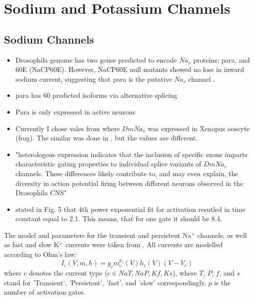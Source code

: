 \documentclass[../../workflow.tex]{subfiles}
\begin{document}
\section{Sodium and Potassium Channels}

\subsection{Sodium Channels}

\begin{itemize}
    \item Drosophila genome has two genes predicted to encode $Na_v$ proteins: para, and
    60E (NaCP60E). However, NaCP60E null mutants showed no loss in inward sodium current,
    suggesting that para is the putative $Na_v$ channel \parencite{ravenscroftDrosophilaVoltageGatedSodium2020}.
    \item para has 60 predicted isoforms via alternative splicing \parencite{ravenscroftDrosophilaVoltageGatedSodium2020}
    \item Para is only expressed in active neurons \parencite{ravenscroftDrosophilaVoltageGatedSodium2020}
    \item Currently I chose vales from \parencite{warmkeFunctionalExpressionDrosophila1997} where
    $DmNa_v$ was expressed in Xenopus ooscyte (frog). The similar was done in
    \parencite{linAlternativeSplicingVoltageGated2009}, but the values are different.
    \item "heterologous expression indicates that the inclusion of specific exons imparts
    characteristic gating properties to individual splice variants of $DmNa_v$ channels.
    These differences likely contribute to, and may even explain, the diversity in action
    potential firing between different neurons observed in the Drosophila CNS"
    \item \parencite{ravenscroftDrosophilaVoltageGatedSodium2020} stated in Fig. 5 that
    4th power exponential fit for activation resutled in time constant equal to 2.1.
    This means, that for one gate it should be 8.4.
\end{itemize}


The model and parameters for the transient and persistent Na$^+$ channels,
as well as fast and slow K$^+$ currents were taken from
\parencite{gunayDistalSpikeInitiation2015}. All currents are modelled according to Ohm's law:
\begin{equation*}
    I_{c}(V,m,h) = g_{c} m_{c}^{p_c}(V) h_{c}(V) (V - V_{c})
\end{equation*}
where $c$ denotes the current type ($c \in {NaT,NaP,Kf,Ks}$), where $T$, $P$, $f$, and $s$
stand for 'Transient', 'Persistent', 'fast', and 'slow' correspondingly, $p$ is the number of activation gates.
\end{document}
